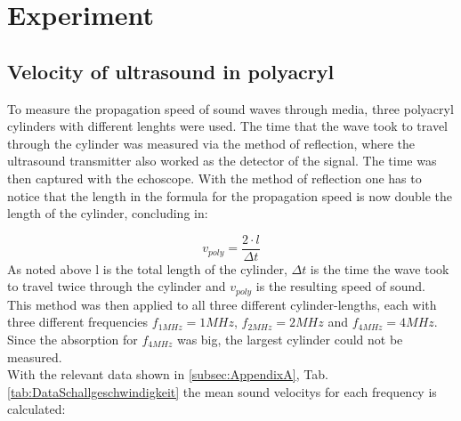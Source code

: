 \section{Experiment} \label{sec:Experiment}

    \subsection{Velocity of ultrasound in polyacryl} \label{subsec:schallgeschwindigkeit}

        To measure the propagation speed of sound waves through media, three polyacryl cylinders with different lenghts were used. The time that the wave
        took to travel through the cylinder was measured via the method of reflection, where the ultrasound transmitter also worked as the detector of the signal.
        The time was then captured with the echoscope. With the method of reflection one has to notice that the length in the formula for the propagation speed
        is now double the length of the cylinder, concluding in:

        \begin{equation}
            v_{poly} = \frac{2 \cdot l}{\Delta t}
            \label{eq:schallgeschwindigkeit}
        \end{equation}
        \noindent
        As noted above l is the total length of the cylinder, $\Delta t$ is the time the wave took to travel twice through the cylinder and $v_{poly}$ is the
        resulting speed of sound. \\
        This method was then applied to all three different cylinder-lengths, each with three different frequencies $f_{1MHz} = 1 MHz$, $f_{2MHz} = 2 MHz$
        and $f_{4MHz} = 4 MHz$. Since the absorption for $f_{4MHz}$ was big, the largest cylinder could not be measured. \\
        With the relevant data shown in \ref{subsec:AppendixA}, Tab. \ref{tab:DataSchallgeschwindigkeit} the mean sound velocitys for each frequency is calculated:

